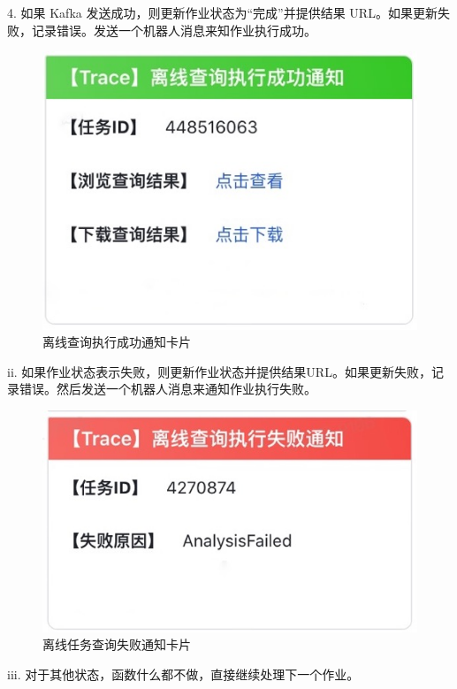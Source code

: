 \begin{longtable}[htbp]
4.	如果 Kafka 发送成功，则更新作业状态为“完成”并提供结果 URL。如果更新失败，记录错误。发送一个机器人消息来知作业执行成功。 

 \begin{figure}[htbp]
  \centering
  \includegraphics[scale=0.5]{figure/chapter5/离线查询执行成功通知卡片.jpg}
  \caption{离线查询执行成功通知卡片}\label{offlineSearchTaskCardSuccess}
\end{figure}
\newpage
ii.	如果作业状态表示失败，则更新作业状态并提供结果URL。如果更新失败，记录错误。然后发送一个机器人消息来通知作业执行失败。

  \begin{figure}[htbp]
  \centering
  \includegraphics[scale=0.45]{figure/chapter5/离线任务查询失败通知卡片.jpg}
  \caption{离线任务查询失败通知卡片}\label{offlineSearchTaskCardFail}
\end{figure}


iii.	对于其他状态，函数什么都不做，直接继续处理下一个作业。


\end{longtable}
